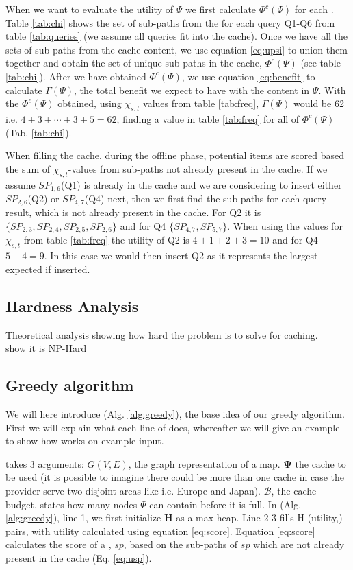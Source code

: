 When we want to evaluate the utility of $\Psi$ we first calculate $\Phi^c(\Psi)$ for each \spathns. Table \ref{tab:chi} shows the set of sub-paths from the \spaths for each query Q1-Q6 from table \ref{tab:queries} (we assume all queries fit into the cache). Once we have all the sets of sub-paths from the cache content, we use equation \ref{eq:upsi} to union them together and obtain the set of unique sub-paths in the cache, $\Phi^c(\Psi)$ (see table \ref{tab:chi}). After we have obtained $\Phi^c(\Psi)$, we use equation \ref{eq:benefit} to calculate $\Gamma(\Psi)$, the total benefit we expect to have with the content in $\Psi$. With the $\Phi^c(\Psi)$ obtained, using $\chi_{s,t}$ values from table \ref{tab:freq}, $\Gamma(\Psi)$ would be 62 i.e. $4+3+\dotsb+3+5 = 62$, finding a value in table \ref{tab:freq} for all \spaths of $\Phi^c(\Psi)$ (Tab. \ref{tab:chi}).

When filling the cache, during the offline phase, potential \spath items are scored based the sum of $\chi_{s,t}$-values from sub-paths not already present in the cache. If we assume $SP_{1,6}$(Q1) is already in the cache and we are considering to insert either $SP_{2,6}$(Q2) or $SP_{4,7}$(Q4) next, then we first find the sub-paths for each query result, which is not already present in the cache. For Q2 it is $\{SP_{2,3},SP_{2,4},SP_{2,5},SP_{2,6}\}$ and for Q4 $\{SP_{4,7},SP_{5,7}\}$. When using the values for $\chi_{s,t}$ from table \ref{tab:freq} the utility of Q2 is $4+1+2+3=10$ and for Q4 $5+4=9$. In this case we would then insert Q2 as it represents the largest expected if inserted.

\subsection{Hardness Analysis}
Theoretical analysis showing how hard the problem is to solve for \spath caching.\\
show it is NP-Hard
 

\subsection{Greedy algorithm}
We will here introduce \salgo (Alg. \ref{alg:greedy}), the base idea of our greedy algorithm. First we will explain what each line of \salgo does, whereafter we will give an example to show how \salgo works on example input.

\salgo takes 3 arguments: $G(V,E)$, the graph representation of a map. $\mathbf{\Psi}$ the cache to be used (it is possible to imagine there could be more than one cache in case the \spath provider serve two disjoint areas like i.e. Europe and Japan). $\mathcal{B}$, the cache budget, states how many nodes $\Psi$ can contain before it is full.
In \salgo (Alg. \ref{alg:greedy}), line 1, we first initialize \textbf{H} as a max-heap. Line 2-3 fills H (utility,\spath) pairs, with utility calculated using equation \ref{eq:score}. 
Equation \ref{eq:score} calculates the score of a \spathns, $sp$, based on the sub-paths of $sp$ which are not already present in the cache (Eq. \ref{eq:usp}).

